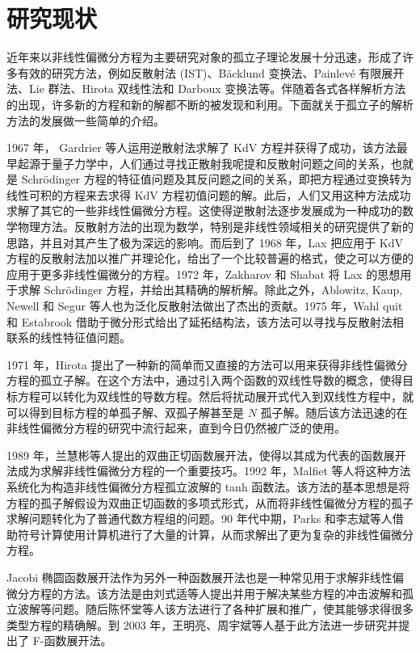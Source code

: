 \section{研究现状}
近年来以非线性偏微分方程为主要研究对象的孤立子理论发展十分迅速，形成了许多有效的研究方法，例如反散射法 (IST)、B\"{a}cklund 变换法、Painlev\'{e} 有限展开法、Lie 群法、Hirota 双线性法和 Darboux 变换法等。伴随着各式各样解析方法的出现，许多新的方程和新的解都不断的被发现和利用。下面就关于孤立子的解析方法的发展做一些简单的介绍。

1967 年， Gardrier 等人运用逆散射法求解了 KdV 方程并获得了成功，该方法最早起源于量子力学中，人们通过寻找正散射我呢提和反散射问题之间的关系，也就是 Schr\"{o}dinger 方程的特征值问题及其反问题之间的关系，即把方程通过变换转为线性可积的方程来去求得 KdV 方程初值问题的解。此后，人们又用这种方法成功求解了其它的一些非线性偏微分方程。这使得逆散射法逐步发展成为一种成功的数学物理方法。反散射方法的出现为数学，特别是非线性领域相关的研究提供了新的思路，并且对其产生了极为深远的影响。而后到了 1968 年，Lax 把应用于 KdV 方程的反散射法加以推广并理论化，给出了一个比较普遍的格式，使之可以方便的应用于更多非线性偏微分的方程。1972 年，Zakharov 和 Shabat 将 Lax 的思想用于求解 Schr\"{o}dinger 方程，并给出其精确的解析解。除此之外，Ablowitz, Kaup, Newell 和 Segur 等人也为泛化反散射法做出了杰出的贡献。1975 年，Wahl quit 和 Estabrook 借助于微分形式给出了延拓结构法，该方法可以寻找与反散射法相联系的线性特征值问题。

1971 年，Hirota 提出了一种新的简单而又直接的方法可以用来获得非线性偏微分方程的孤立子解。在这个方法中，通过引入两个函数的双线性导数的概念，使得目标方程可以转化为双线性的导数方程。然后将扰动展开式代入到双线性方程中，就可以得到目标方程的单孤子解、双孤子解甚至是 $N$ 孤子解。随后该方法迅速的在非线性偏微分方程的研究中流行起来，直到今日仍然被广泛的使用。

1989 年，兰慧彬等人提出的双曲正切函数展开法，使得以其成为代表的函数展开法成为求解非线性偏微分方程的一个重要技巧。1992 年，Malfiet 等人将这种方法系统化为构造非线性偏微分方程孤立波解的 tanh 函数法。该方法的基本思想是将方程的孤子解假设为双曲正切函数的多项式形式，从而将非线性偏微分方程的孤子求解问题转化为了普通代数方程组的问题。90 年代中期，Parks 和李志斌等人借助符号计算使用计算机进行了大量的计算，从而求解出了更为复杂的非线性偏微分方程。

Jacobi 椭圆函数展开法作为另外一种函数展开法也是一种常见用于求解非线性偏微分方程的方法。该方法是由刘式适等人提出并用于解决某些方程的冲击波解和孤立波解等问题。随后陈怀堂等人该方法进行了各种扩展和推广，使其能够求得很多类型方程的精确解。到 2003 年，王明亮、周宇斌等人基于此方法进一步研究并提出了 F-函数展开法。

